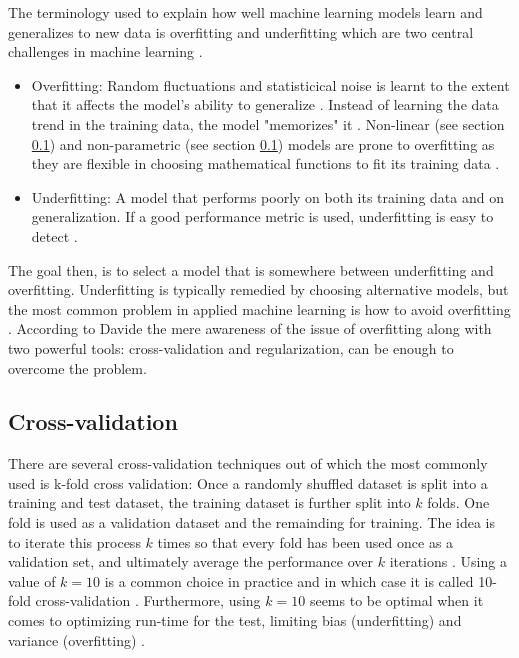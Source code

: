 	The terminology used to explain how well machine learning models learn and generalizes to new data is overfitting and underfitting \cite{WEBSITE:8} which are two central challenges in machine learning \cite{BOOK:1}. 
\begin{itemize}
	\item{Overfitting:} Random fluctuations and statisticical noise is learnt to the extent that it affects the model's ability to generalize \cite{WEBSITE:8}. Instead of learning the data trend in the training data, the model "memorizes" it \cite{ARTICLE:4}. Non-linear (see section \ref{}) and non-parametric (see section \ref{}) models are prone to overfitting as they are flexible in choosing mathematical functions to fit its training data \cite{WEBSITE:8}.  
	\item{Underfitting:} A model that performs poorly on both its training data and on generalization. If a good performance metric is used, underfitting is  easy to detect \cite{WEBSITE:8}.
\end{itemize}
The goal then, is to select a model that is somewhere between underfitting and overfitting. Underfitting is typically remedied by choosing alternative models, but the most common problem in applied machine learning is how to avoid overfitting \cite{WEBSITE:8}. According to Davide \cite{ARTICLE:4}  the mere awareness of the issue of overfitting along with two powerful tools: cross-validation and regularization, can be enough to overcome the problem.

	\subsection{Cross-validation}
	There are several cross-validation techniques out of which the most commonly used is k-fold cross validation: Once a randomly shuffled dataset is split into a training and test dataset, the training dataset is further split into $k$ folds. One fold is used as a validation dataset and the remainding for training. The idea is to iterate this process $k$ times so that every fold has been used once as a validation set, and ultimately average the performance over $k$ iterations . Using a value of $k = 10$ is a common choice in practice and in which case it is called 10-fold cross-validation \cite{ARTICLE:4}. Furthermore, using $k=10$ seems to be optimal when it comes to optimizing run-time for the test, limiting bias (underfitting) and variance (overfitting) \cite{BOOK:4}.   

